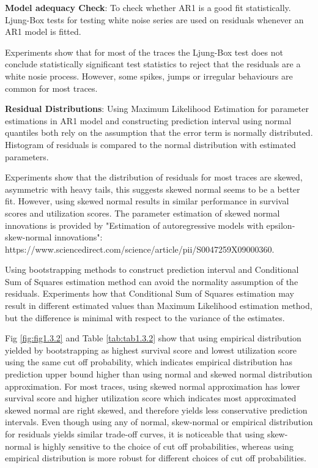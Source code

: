 \documentclass{article}
\begin{document}
\begin{flushleft}
\textbf{Model adequacy Check}: To check whether AR1 is a good fit statistically.
Ljung-Box tests for testing white noise series are used on residuals whenever an
AR1 model is fitted.

Experiments show that for most of the traces the Ljung-Box test does not
conclude statistically significant test statistics to reject that the residuals
are a white nosie process. However, some spikes, jumps or irregular behaviours
are common for most traces. 
\end{flushleft}

\begin{flushleft}
\textbf{Residual Distributions}: Using Maximum Likelihood Estimation for
parameter estimations in AR1 model and constructing prediction interval using
normal quantiles both rely on the assumption that the error term is normally
distributed. Histogram of residuals is compared to the normal distribution with
estimated parameters.

Experiments show that the distribution of residuals for most traces are skewed,
asymmetric with heavy tails, this suggests skewed normal seems to be a better
fit. However, using skewed normal results in similar performance in survival
scores and utilization scores. The parameter estimation of skewed normal
innovations is provided by "Estimation of autoregressive models with
epsilon-skew-normal innovations":
https://www.sciencedirect.com/science/article/pii/S0047259X09000360.

Using bootstrapping methods to construct prediction interval and Conditional Sum
of Squares estimation method can avoid the normality assumption of the
residuals. Experiments how that Conditional Sum of Squares estimation may result
in different estimated values than Maximum Likelihood estimation method, but the
difference is minimal with respect to the variance of the estimates. 

Fig \ref{fig:fig1.3.2} and Table \ref{tab:tab1.3.2} show that using empirical
distribution yielded by bootstrapping as highest survival score and lowest
utilization score using the same cut off probability, which indicates empirical
distribution has prediction upper bound higher than using normal and skewed
normal distribution approximation. For most traces, using skewed normal
approximation has lower survival score and higher utilization score which
indicates most approximated skewed normal are right skewed, and therefore yields
less conservative prediction intervals. Even though using any of normal,
skew-normal or empirical distribution for residuals yields similar trade-off
curves, it is noticeable that using skew-normal is highly sensitive to the
choice of cut off probabilities, whereas using empirical distribution is more
robust for different choices of cut off probabilities.
\end{flushleft}
\end{document}
